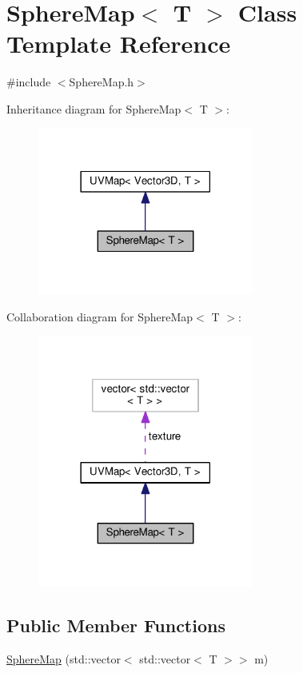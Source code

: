 \hypertarget{classSphereMap}{}\section{Sphere\+Map$<$ T $>$ Class Template Reference}
\label{classSphereMap}


{\ttfamily \#include $<$Sphere\+Map.\+h$>$}



Inheritance diagram for Sphere\+Map$<$ T $>$\+:\nopagebreak
\begin{figure}[H]
\begin{center}
\leavevmode
\includegraphics[width=201pt]{classSphereMap__inherit__graph}
\end{center}
\end{figure}


Collaboration diagram for Sphere\+Map$<$ T $>$\+:\nopagebreak
\begin{figure}[H]
\begin{center}
\leavevmode
\includegraphics[width=201pt]{classSphereMap__coll__graph}
\end{center}
\end{figure}
\subsection*{Public Member Functions}
\begin{DoxyCompactItemize}
\item 
\hyperlink{classSphereMap_ab8c9adf071beed745fee8c7ee8c3bbc1}{Sphere\+Map} (std\+::vector$<$ std\+::vector$<$ T $>$$>$ m)
\end{DoxyCompactItemize}

